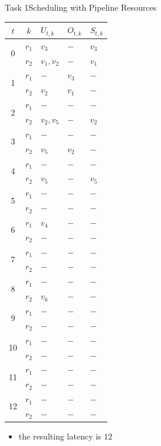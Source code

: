 \begin{frame}{Task 1}{Scheduling with Pipeline Resources}
  \begin{solutionnoinc}
      \centering
      \fontsize{4}{5}\selectfont
      \begin{tabular}{c|c|l|l|l|}
      \hline$t$ & $k$ & $U_{t, k}$ & $O_{t, k}$ & $S_{t, k}$ \\
      \hline \multirow{2}{*}{0} & $r_1$ & $v_3$ & $-$ & $v_3$ \\
      \cline { 2 - 5 } & $r_2$ & $v_1, v_2$ & $-$ & $v_1$ \\
      \hline \multirow{2}{*}{1} & $r_1$ & $-$ & $v_3$ & $-$ \\
      \cline { 2 - 5 } & $r_2$ & $v_2$ & $v_1$ & $-$ \\
      \hline \multirow{2}{*}{2} & $r_1$ & $-$ & $-$ & $-$ \\
      \cline { 2 - 5 } & $r_2$ & $v_2, v_5$ & $-$ & $v_2$ \\
      \hline \multirow{2}{*}{3} & $r_1$ & $-$ & $-$ & $-$ \\
      \cline { 2 - 5 } & $r_2$ & $v_5$ & $v_2$ & $-$ \\
      \hline \multirow{2}{*}{4} & $r_1$ & $-$ & $-$ & $-$ \\
      \cline { 2 - 5 } & $r_2$ & $v_5$ & $-$ & $v_5$ \\
      \hline \multirow{2}{*}{5} & $r_1$ & $-$ & $-$ & $-$ \\
      \cline { 2 - 5 } & $r_2$ & $-$ & $-$ & $-$ \\
      \hline \multirow{2}{*}{6} & $r_1$ & $v_4$ & $-$ & $-$ \\
      \cline { 2 - 5 } & $r_2$ & $-$ & $-$ & $-$ \\
      \hline \multirow{2}{*}{7} & $r_1$ & $-$ & $-$ & $-$ \\
      \cline { 2 - 5 } & $r_2$ & $-$ & $-$ & $-$ \\
      \hline \multirow{2}{*}{8} & $r_1$ & $-$ & $-$ & $-$ \\
      \cline { 2 - 5 } & $r_2$ & $v_6$ & $-$ & $-$ \\
      \hline \multirow{2}{*}{9} & $r_1$ & $-$ & $-$ & $-$ \\
      \cline { 2 - 5 } & $r_2$ & $-$ & $-$ & $-$ \\
      \hline \multirow{2}{*}{10} & $r_1$ & $-$ & $-$ & $-$ \\
      \cline { 2 - 5 } & $r_2$ & $-$ & $-$ & $-$ \\
      \hline \multirow{2}{*}{11} & $r_1$ & $-$ & $-$ & $-$ \\
      \cline { 2 - 5 } & $r_2$ & $-$ & $-$ & $-$ \\
      \hline \multirow{2}{*}{12} & $r_1$ & $-$ & $-$ & $-$ \\
      \cline { 2 - 5 } & $r_2$ & $-$ & $-$ & $-$ \\
      \hline
      \end{tabular}
  \end{solutionnoinc}
\end{frame}
\begin{frame}
  \begin{solutionnoinc}
    \begin{itemize}
      \item the resulting latency is $12$
    \end{itemize}
  \end{solutionnoinc}
\end{frame}
